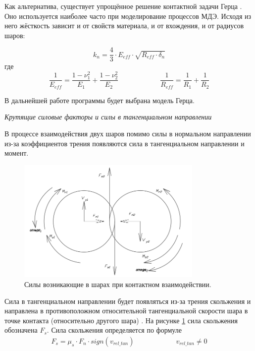 \documentclass[a4paper]{article}
\begin{document}
Как альтернатива, существует упрощённое решение контактной задачи Герца \cite{friction_calibration}.
Оно используется наиболее часто при моделирование процессов МДЭ.
Исходя из него жёсткость зависит и от свойств материала, и от вхождения, и от радиусов шаров:

\begin{equation}
\label{kn_herz}
k_n = \frac{4}{3} \cdot E_{eff} \cdot \sqrt{R_{eff} \cdot \delta_n}
\end{equation}
где 
\[
\dfrac{1}{E_{eff}} = \dfrac{1 - \nu_1^2}{E_1} + \dfrac{1 - \nu_2^2}{E_2} \qquad \qquad \qquad \dfrac{1}{R_{eff}} = \dfrac{1}{R_1} + \dfrac{1}{R_2}
\]

В дальнейшей работе программы будет выбрана модель Герца.


\textit{Крутящие силовые факторы и силы в тангенциальном направлении}
\label{angular_subsection}


В процессе взаимодействия двух шаров помимо силы в нормальном направлении из-за коэффициентов трения появляются сила в тангенциальном направлении и момент.

\begin{figure}[h!]
	\centering
	\includegraphics[width=0.8\textwidth]{sily}
	\caption{Силы возникающие в шарах при контактном взаимодействии.}
	\label{pic:sily}
\end{figure} 

Сила в тангенциальном направлении будет появляться из-за трения скольжения и направлена в противоположном относительной тангенциальной скорости шара в точке контакта (относительно другого шара) \cite{friction_calibration}. На рисунке \ref{pic:sily} сила скольжения обозначена $F_s$. Сила скольжения определяется по формуле
\begin{align}
\label{sliding_force}
F_s = \mu_s \cdot F_n \cdot sign(v_{rel\_tan}) \qquad \qquad \qquad v_{rel\_tan} \neq 0
\end{align}
\end{document}
